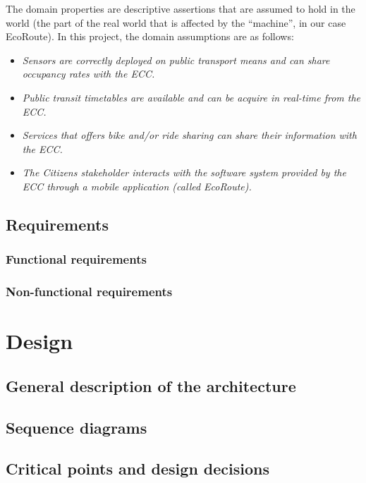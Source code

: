\documentclass[a4paper]{article}
\newcommand{\dquotes}[1]{``#1''}
\begin{document}
    The domain properties are descriptive assertions that are assumed to hold in the world (the part of the real world that is affected by the \dquotes{machine}, in our case EcoRoute). In this project, the domain assumptions are as follows:
    \begin{itemize}
        \item \emph{Sensors are correctly deployed on public transport means and can share occupancy rates with the ECC.}
        
        \item \emph{Public transit timetables are available and can be acquire in real-time from the ECC.}

        \item \emph{Services that offers bike and/or ride sharing can share their information with the ECC.}
        
        \item \emph{The Citizens stakeholder interacts with the software system provided by the ECC through a mobile application (called EcoRoute).}
    \end{itemize}

    \newpage

    \subsection{Requirements}

    \subsubsection{Functional requirements}

    \subsubsection{Non-functional requirements}

    \newpage

    \section{Design}

    \subsection{General description of the architecture}

    \subsection{Sequence diagrams}

    \subsection{Critical points and design decisions}
\end{document}

